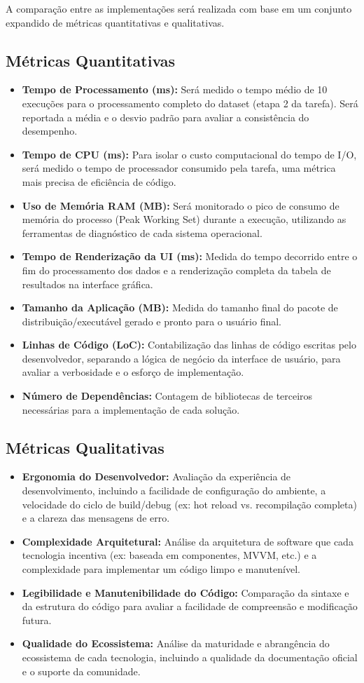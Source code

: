A comparação entre as implementações será realizada com base em um conjunto expandido de métricas quantitativas e qualitativas.

\subsection{Métricas Quantitativas}
\begin{itemize}
	\item \textbf{Tempo de Processamento (ms):} Será medido o tempo médio de 10 execuções para o processamento completo do dataset (etapa 2 da tarefa). Será reportada a média e o desvio padrão para avaliar a consistência do desempenho.
	\item \textbf{Tempo de CPU (ms):} Para isolar o custo computacional do tempo de I/O, será medido o tempo de processador consumido pela tarefa, uma métrica mais precisa de eficiência de código.
	\item \textbf{Uso de Memória RAM (MB):} Será monitorado o pico de consumo de memória do processo (Peak Working Set) durante a execução, utilizando as ferramentas de diagnóstico de cada sistema operacional.
	\item \textbf{Tempo de Renderização da UI (ms):} Medida do tempo decorrido entre o fim do processamento dos dados e a renderização completa da tabela de resultados na interface gráfica.
	\item \textbf{Tamanho da Aplicação (MB):} Medida do tamanho final do pacote de distribuição/executável gerado e pronto para o usuário final.
	\item \textbf{Linhas de Código (LoC):} Contabilização das linhas de código escritas pelo desenvolvedor, separando a lógica de negócio da interface de usuário, para avaliar a verbosidade e o esforço de implementação.
	\item \textbf{Número de Dependências:} Contagem de bibliotecas de terceiros necessárias para a implementação de cada solução.
\end{itemize}

\subsection{Métricas Qualitativas}
\begin{itemize}
	\item \textbf{Ergonomia do Desenvolvedor:} Avaliação da experiência de desenvolvimento, incluindo a facilidade de configuração do ambiente, a velocidade do ciclo de build/debug (ex: hot reload vs. recompilação completa) e a clareza das mensagens de erro.
	\item \textbf{Complexidade Arquitetural:} Análise da arquitetura de software que cada tecnologia incentiva (ex: baseada em componentes, MVVM, etc.) e a complexidade para implementar um código limpo e manutenível.
	\item \textbf{Legibilidade e Manutenibilidade do Código:} Comparação da sintaxe e da estrutura do código para avaliar a facilidade de compreensão e modificação futura.
	\item \textbf{Qualidade do Ecossistema:} Análise da maturidade e abrangência do ecossistema de cada tecnologia, incluindo a qualidade da documentação oficial e o suporte da comunidade.
\end{itemize}